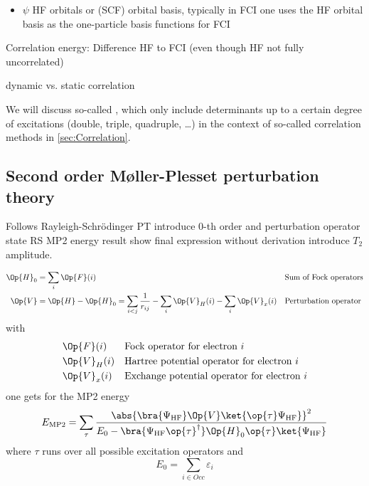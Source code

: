 \begin{itemize}
\item
$\psi$ HF orbitals or (SCF) orbital basis,
typically in FCI one uses the HF orbital basis as the one-particle basis functions for FCI
	\end{itemize}



Correlation energy: Difference HF to FCI
(even though HF not fully uncorrelated)

dynamic vs. static correlation


We will discuss so-called ,
which only include determinants up to a certain
degree of excitations (double, triple, quadruple, \ldots)
in the context of so-called correlation methods in \vref{sec:Correlation}.


\subsection{Second order Møller-Plesset perturbation theory}
\label{sec:MP}



Follows Rayleigh-Schrödinger PT
introduce 0-th order and perturbation operator
state RS MP2 energy result
show final expression without derivation
introduce $T_2$ amplitude.

\begin{align*}
	\Op{H}_0 &= \sum_i \Op{F}(i) && \text{Sum of Fock operators} \\
	\Op{V} &= \Op{H} - \Op{H}_0 = \sum_{i<j} \frac{1}{r_{ij}} - \sum_i \Op{V}_H(i) - \sum_i \Op{V}_x(i) && \text{Perturbation operator}
\end{align*}
with
\begin{align*}
	&\Op{F}(i) && \text{Fock operator for electron $i$} \\
	&\Op{V}_H(i) && \text{Hartree potential operator for electron $i$} \\
	&\Op{V}_x(i) && \text{Exchange potential operator for electron $i$} \\
\end{align*}
one gets for the MP2 energy
\begin{align*}
	E_\text{MP2} = \sum_\tau \frac{ \abs{ \bra{\Psi_\text{HF}} \Op{V} \ket{\op{\tau} \Psi_\text{HF}} }^2 }
	{ E_0 - \bra{\Psi_\text{HF}\op{\tau}^\dagger } \Op{H}_0 \op{\tau} \ket{\Psi_\text{HF}}}
\end{align*}
where $\tau$ runs over all possible excitation operators and
\[
	E_0 = \sum_{i \in Occ} \varepsilon_i 
\]

